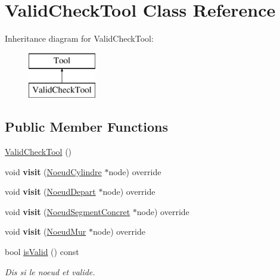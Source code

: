\hypertarget{class_valid_check_tool}{}\section{Valid\+Check\+Tool Class Reference}
\label{class_valid_check_tool}
Inheritance diagram for Valid\+Check\+Tool\+:\begin{figure}[H]
\begin{center}
\leavevmode
\includegraphics[height=2.000000cm]{class_valid_check_tool}
\end{center}
\end{figure}
\subsection*{Public Member Functions}
\begin{DoxyCompactItemize}
\item 
\hyperlink{group__inf2990_ga4e827b025969ce7fa8204c6a62cf27c6}{Valid\+Check\+Tool} ()
\item 
\hypertarget{group__inf2990_ga032c8fa96e75b6300ce0ad8692250c0c}{}void {\bfseries visit} (\hyperlink{class_noeud_cylindre}{Noeud\+Cylindre} $\ast$node) override\label{group__inf2990_ga032c8fa96e75b6300ce0ad8692250c0c}

\item 
\hypertarget{group__inf2990_gab3f77ff9294703aa3b3806c505421136}{}void {\bfseries visit} (\hyperlink{class_noeud_depart}{Noeud\+Depart} $\ast$node) override\label{group__inf2990_gab3f77ff9294703aa3b3806c505421136}

\item 
\hypertarget{group__inf2990_ga78a2a77e640811375ddcf280792bc9ce}{}void {\bfseries visit} (\hyperlink{class_noeud_segment_concret}{Noeud\+Segment\+Concret} $\ast$node) override\label{group__inf2990_ga78a2a77e640811375ddcf280792bc9ce}

\item 
\hypertarget{group__inf2990_gad91e261311122bc94172813602534772}{}void {\bfseries visit} (\hyperlink{class_noeud_mur}{Noeud\+Mur} $\ast$node) override\label{group__inf2990_gad91e261311122bc94172813602534772}

\item 
bool \hyperlink{group__inf2990_ga8917a37ee52e2661d510c79a43a4032d}{is\+Valid} () const 
\begin{DoxyCompactList}\small\item\em Dis si le noeud et valide. \end{DoxyCompactList}\end{DoxyCompactItemize}
